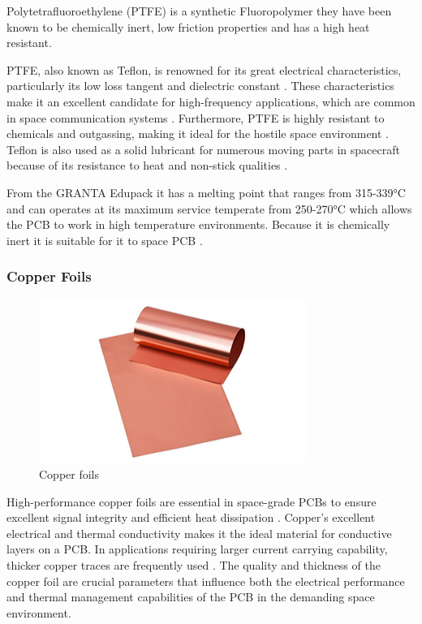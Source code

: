 Polytetrafluoroethylene (PTFE) is a synthetic Fluoropolymer they have been known to be chemically inert, low friction properties and has a high heat resistant.

PTFE, also known as Teflon, is renowned for its great electrical characteristics, particularly its low loss tangent and dielectric constant \cite{CadenceDesignSystems2025}. 
These characteristics make it an excellent candidate for high-frequency applications, which are common in space communication systems \cite{CadenceDesignSystems2025}. 
Furthermore, PTFE is highly resistant to chemicals and outgassing, making it ideal for the hostile space environment \cite{CadenceDesignSystems2025}. 
Teflon is also used as a solid lubricant for numerous moving parts in spacecraft because of its resistance to heat and non-stick qualities \cite{FarrellLou2023}.

From the GRANTA Edupack it has a melting point that ranges from 315-339°C and can operates at its maximum service temperate from 250-270°C which allows the PCB to work in high temperature environments. 
Because it is chemically inert it is suitable for it to space PCB \cite{RayMingPCB2023}.

\subsubsection{Copper Foils}
\begin{figure}[htbp]
    \centering
    \includegraphics[width=8.7cm]{chapters/methodology/MaterialAnalysis/Fig4Copper.png}
    \caption{Copper foils \cite{ViinSolutions2022}}
    \label{fig:copper-foils}
\end{figure}

High-performance copper foils are essential in space-grade PCBs to ensure excellent signal integrity and efficient heat dissipation \cite{CadenceDesignSystems2025}. 
Copper's excellent electrical and thermal conductivity makes it the ideal material for conductive layers on a PCB. 
In applications requiring larger current carrying capability, thicker copper traces are frequently used \cite{SAEInternational2022}. 
The quality and thickness of the copper foil are crucial parameters that influence both the electrical performance and thermal management capabilities of the PCB in the demanding space environment.

